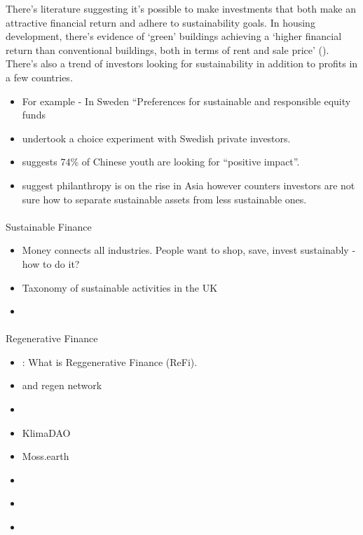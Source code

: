 \documentclass[
  letterpaper,
  DIV=11,
  numbers=noendperiod]{scrartcl}
\makeatletter
\let\oldparagraph\paragraph
\renewcommand{\paragraph}{
    \@ifstar
      \xxxParagraphStar
      \xxxParagraphNoStar
  }
\newcommand{\xxxParagraphStar}[1]{\oldparagraph*{#1}\mbox{}}
\newcommand{\xxxParagraphNoStar}[1]{\oldparagraph{#1}\mbox{}}
\providecommand{\tightlist}{%
  \setlength{\itemsep}{0pt}\setlength{\parskip}{0pt}}\usepackage{longtable,booktabs,array}
\makeatother
\begin{document}
There's literature suggesting it's possible to make investments that
both make an attractive financial return and adhere to sustainability
goals. In housing development, there's evidence of `green' buildings
achieving a `higher financial return than conventional buildings, both
in terms of rent and sale price'
(\citet{oyedokunGreenPremiumDriver2017}). There's also a trend of
investors looking for sustainability in addition to profits in a few
countries.

\begin{itemize}
\item
  For example - In Sweden ``Preferences for sustainable and responsible
  equity funds
\item
  \citet{lagerkvistPreferencesSustainableResponsible2020} undertook a
  choice experiment with Swedish private investors.
\item
  \citet{smithChinaUltraElite2019} suggests 74\% of Chinese youth are
  looking for ``positive impact''.
\item
  \citet{lingeswaranLevellingShatteringMyths2019} suggest philanthropy
  is on the rise in Asia however \citet{hoAsianInvestorsAre2019}
  counters investors are not sure how to separate sustainable assets
  from less sustainable ones.
\end{itemize}

\paragraph{Sustainable Finance}\label{sustainable-finance}

\begin{itemize}
\item
  Money connects all industries. People want to shop, save, invest
  sustainably - how to do it?
\item
  \citet{ChancellorSetsOut} Taxonomy of sustainable activities in the UK
\item
  \citet{WorldEconomicOutlook2023}
\end{itemize}

\paragraph{Regenerative Finance}\label{regenerative-finance}

\begin{itemize}
\tightlist
\item
  \citet{WhatReFiRegenerative2023}: What is Reggenerative Finance
  (ReFi).
\item
  \citet{regennetworkCommunityDevelopmentCall22} and
  \citet{regennetworkRegenNetworkInvest2023} regen network
\item
  \citet{smithOneYearLater2021}
\item
  \citet{KlimaDAO2023} KlimaDAO
\item
  \citet{PlanetKlimatesLuis} Moss.earth
\item
  \citet{SociallyResponsibleInvesting}
\item
  \citet{naturalinvestMalaikaMaphalalaNatural2020}
\item
  \citet{marquisRSFLeadingWay2021}
\end{itemize}
\end{document}
